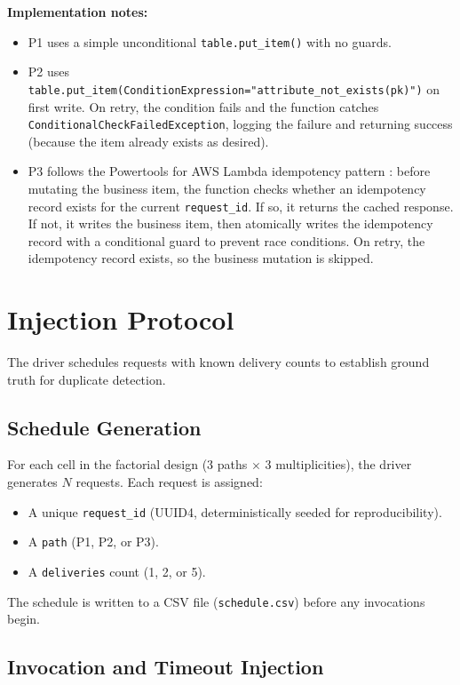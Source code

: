 \textbf{Implementation notes:}

\begin{itemize}
    \item P1 uses a simple unconditional \texttt{table.put\_item()} with no guards.
    \item P2 uses \texttt{table.put\_item(ConditionExpression="attribute\_not\_exists(pk)")} on first write. On retry, the condition fails and the function catches \texttt{ConditionalCheckFailedException}, logging the failure and returning success (because the item already exists as desired).
    \item P3 follows the Powertools for AWS Lambda idempotency pattern \citep{AWSPowertoolsDocs}: before mutating the business item, the function checks whether an idempotency record exists for the current \texttt{request\_id}. If so, it returns the cached response. If not, it writes the business item, then atomically writes the idempotency record with a conditional guard to prevent race conditions. On retry, the idempotency record exists, so the business mutation is skipped.
\end{itemize}

\section{Injection Protocol}

The driver schedules requests with known delivery counts to establish ground truth for duplicate detection.

\subsection{Schedule Generation}

For each cell in the factorial design (3 paths $\times$ 3 multiplicities), the driver generates $N$ requests. Each request is assigned:

\begin{itemize}
    \item A unique \texttt{request\_id} (UUID4, deterministically seeded for reproducibility).
    \item A \texttt{path} (P1, P2, or P3).
    \item A \texttt{deliveries} count (1, 2, or 5).
\end{itemize}

The schedule is written to a CSV file (\texttt{schedule.csv}) before any invocations begin.

\subsection{Invocation and Timeout Injection}

